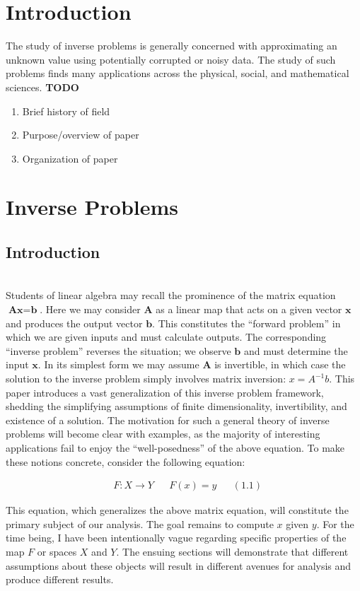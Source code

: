 \documentclass[12pt]{amsart}
\begin{document}
\section{Introduction} 
The study of inverse problems is generally concerned with approximating an unknown value using potentially corrupted or noisy data. The study of such problems finds many applications across the physical, social, and mathematical sciences. 
\textbf{TODO}
\begin{enumerate} 
\item Brief history of field
\item Purpose/overview of paper
\item Organization of paper
\end{enumerate} 

\section{Inverse Problems}

\subsection{Introduction} \hfill \\
Students of linear algebra may recall the prominence of the matrix equation $\textbf{Ax} = \textbf{b}$. Here we may consider $\textbf{A}$ as a linear map that acts on a given vector $\textbf{x}$ and produces the output vector $\textbf{b}$. This constitutes the ``forward problem'' in which we are given inputs and must calculate outputs. The corresponding ``inverse problem'' reverses the situation; we observe $\textbf{b}$ and must determine the input $\textbf{x}$. In its simplest form we may assume $\textbf{A}$ is invertible, in which case the solution to the inverse problem simply involves matrix inversion: $x = A^{-1}b$. This paper introduces a vast generalization of this inverse problem framework, shedding the simplifying assumptions of finite dimensionality, invertibility, and existence of a solution. The motivation for such a general theory of inverse problems will become clear with examples, as the majority of interesting applications fail to enjoy the ``well-posedness'' of the above equation. To make these notions concrete, consider the following equation:

\begin{align*} 
&F: X \to Y && F(x) = y && (1.1)
\end{align*} 

This equation, which generalizes the above matrix equation, will constitute the primary subject of our analysis. The goal remains to compute $x$ given $y$. For the time being, I have been intentionally vague regarding specific properties of the map $F$ or spaces $X$ and $Y$. The ensuing sections will demonstrate that different assumptions about these objects will result in different avenues for analysis and produce different results. 
\end{document}
